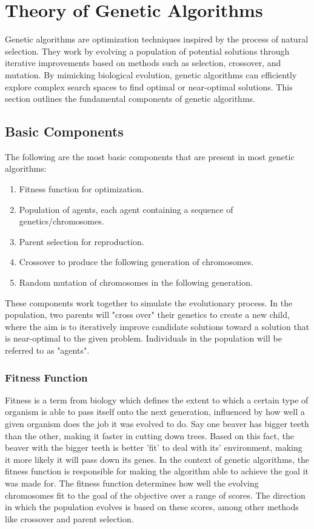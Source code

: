 \documentclass{article}
\begin{document}
\section{Theory of Genetic Algorithms}
Genetic algorithms are optimization techniques inspired by the process of natural selection. They work by evolving a population of potential solutions through iterative improvements based on methods such as selection, crossover, and mutation. By mimicking biological evolution, genetic algorithms can efficiently explore complex search spaces to find optimal or near-optimal solutions. This section outlines the fundamental components of genetic algorithms.

\subsection{Basic Components}
The following are the most basic components that are present in most genetic algorithms:
\begin{enumerate}
    \item Fitness function for optimization.
    \item Population of agents, each agent containing a sequence of genetics/chromosomes.
    \item Parent selection for reproduction.
    \item Crossover to produce the following generation of chromosomes.
    \item Random mutation of chromosomes in the following generation.
\end{enumerate}

These components work together to simulate the evolutionary process. In the population, two parents will "cross over" their genetics to create a new child, where the aim is to iteratively improve candidate solutions toward a solution that is near-optimal to the given problem. Individuals in the population will be referred to as "agents".

\bigbreak
\subsubsection{Fitness Function}
Fitness is a term from biology which defines the extent to which a certain type of organism is able to pass itself onto the next generation, influenced by how well a given organism does the job it was evolved to do. Say one beaver has bigger teeth than the other, making it faster in cutting down trees. Based on this fact, the beaver with the bigger teeth is better 'fit' to deal with its' environment, making it more likely it will pass down its genes.
\smallbreak
In the context of genetic algorithms, the fitness function is responsible for making the algorithm able to achieve the goal it was made for. The fitness function determines how well the evolving chromosomes fit to the goal of the objective over a range of scores. The direction in which the population evolves is based on these scores, among other methods like crossover and parent selection.
\end{document}
